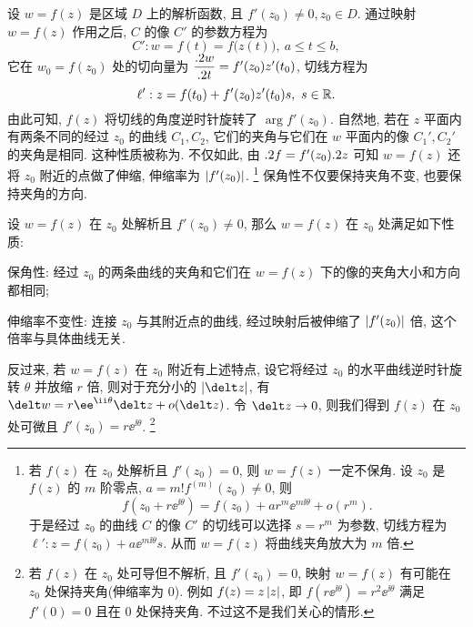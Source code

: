 设 $w=f(z)$ 是区域 $D$ 上的解析函数, 且 $f'(z_0)\neq 0,z_0\in D$.
通过映射 $w=f(z)$ 作用之后, $C$ 的像 $C'$ 的参数方程为
\[
  C':w=f(t)=f\bigl(z(t)\bigr),\ a\le t\le b,
\]
它在 $w_0=f(z_0)$ 处的切向量为 $\dfrac{.2 w}{.2 t}=f'(z_0) z'(t_0)$, 切线方程为
\[
  \ell': z=f(t_0)+f'(z_0) z'(t_0)s,\ s\in{\mathbb{R}}.
\]
由此可知, $f(z)$ 将切线的角度逆时针旋转了 $\arg f'(z_0)$.
自然地, 若在 $z$ 平面内有两条不同的经过 $z_0$ 的曲线 $C_1,C_2$, 它们的夹角与它们在 $w$ 平面内的像 $C_1',C_2'$ 的夹角是相同.
这种性质被称为.
不仅如此, 由 $.2 f=f'(z_0).2 z$ 可知 $w=f(z)$ 还将 $z_0$ 附近的点做了伸缩, 伸缩率为 $\left|f'(z_0)\right|$.
\footnote{
  若 $f(z)$ 在 $z_0$ 处解析且 $f'(z_0)=0$, 则 $w=f(z)$ 一定不保角.
  设 $z_0$ 是 $f(z)$ 的 $m$ 阶零点, $a=m!f^{(m)}(z_0)\neq 0$, 则
  \[
    f(z_0+r\ee^{\ii\theta})=f(z_0)+ar^m\ee^{m\ii\theta}+o(r^m).
  \]
  于是经过 $z_0$ 的曲线 $C$ 的像 $C'$ 的切线可以选择 $s=r^m$ 为参数, 切线方程为 $\ell':z=f(z_0)+a\ee^{m\ii\theta}s$.
  从而 $w=f(z)$ 将曲线夹角放大为 $m$ 倍.
} 
  \alert{保角性不仅要保持夹角不变, 也要保持夹角的方向.}

\begin{theorem}
  \label{thm:analytic-nonzero-coformal}
  设 $w=f(z)$ 在 $z_0$ 处解析且 $f'(z_0)\neq0$, 那么 $w=f(z)$ 在 $z_0$ 处满足如下性质:
  \begin{enuma}
    \item 保角性: 经过 $z_0$ 的两条曲线的夹角和它们在 $w=f(z)$ 下的像的夹角大小和方向都相同;
    \item 伸缩率不变性: 连接 $z_0$ 与其附近点的曲线, 经过映射后被伸缩了 $\left|f'(z_0)\right|$ 倍, 这个倍率与具体曲线无关.\footnotemark
  \end{enuma}
\end{theorem}

反过来, 若 $w=f(z)$ 在 $z_0$ 附近有上述特点, 设它将经过 $z_0$ 的水平曲线逆时针旋转 $\theta$ 并放缩 $r$ 倍, 则对于充分小的 $\abs{\delt z}$, 有 $\delt w=r\ee^{\ii\theta}\delt z+o(\delt z)$.
令 $\delt z\ra 0$, 则我们得到 $f(z)$ 在 $z_0$ 处可微且 $f'(z_0)=r\ee^{\ii\theta}$.
\footnote{
  若 $f(z)$ 在 $z_0$ 处可导但不解析, 且 $f'(z_0)=0$, 映射 $w=f(z)$ 有可能在 $z_0$ 处保持夹角(伸缩率为 $0$).
  例如 $f(z)=z\left|z\right|$, 即 $f(r\ee^{\ii\theta})=r^2\ee^{\ii\theta}$ 满足 $f'(0)=0$ 且在 $0$ 处保持夹角.
  不过这不是我们关心的情形.
}


